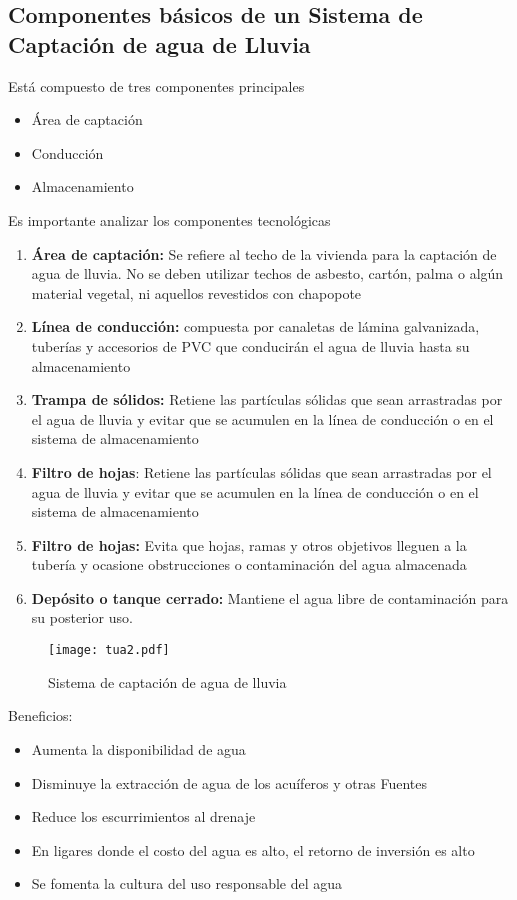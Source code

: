     \subsection{Componentes básicos de un Sistema de Captación de agua de Lluvia}
    Está compuesto de tres componentes principales
    \begin{itemize}
        \item Área de captación
        \item Conducción
        \item Almacenamiento
    \end{itemize}
    Es importante analizar los componentes tecnológicas
    \begin{enumerate}
        \item \textbf{Área de captación:} Se refiere al techo de la vivienda para la captación de agua de lluvia. No se deben utilizar techos de asbesto, cartón, palma o algún material vegetal, ni aquellos revestidos con chapopote
        \item \textbf{Línea de conducción:} compuesta por canaletas de lámina galvanizada, tuberías y accesorios de PVC que conducirán el agua de lluvia hasta su almacenamiento
        \item \textbf{Trampa de sólidos:} Retiene las partículas sólidas que sean arrastradas por el agua de lluvia y evitar que se acumulen en la línea de conducción o en el sistema de almacenamiento
        \item \textbf{Filtro de hojas}: Retiene las partículas sólidas que sean arrastradas por el agua de lluvia y evitar que se acumulen en la línea de conducción o en el sistema de almacenamiento
        \item \textbf{Filtro de hojas:} Evita que hojas, ramas y otros objetivos lleguen a la tubería y ocasione obstrucciones o contaminación del agua almacenada
        \item \textbf{Depósito o tanque cerrado:} Mantiene el agua libre de contaminación para su posterior uso. 
\end{enumerate}
\begin{figure}[h!]
\centering
  \texttt{[image: tua2.pdf]}
  \caption{Sistema de captación de agua de lluvia}
  \label{tua2}
\end{figure}
Beneficios:
\begin{itemize}
    \item Aumenta la disponibilidad de agua
    \item Disminuye la extracción de agua de los acuíferos y otras Fuentes
    \item Reduce los escurrimientos al drenaje
    \item En ligares donde el costo del agua es alto, el retorno de inversión es alto
    \item Se fomenta la cultura del uso responsable del agua
\end{itemize}
